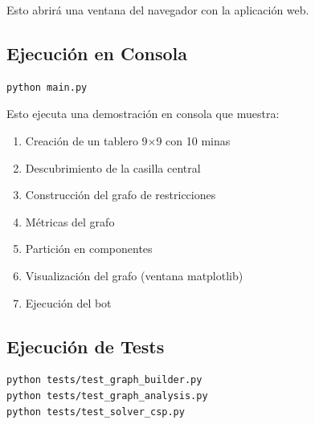 \documentclass[12pt,a4paper]{article}
\begin{document}
Esto abrirá una ventana del navegador con la aplicación web.

\subsection{Ejecución en Consola}

\begin{lstlisting}[language=bash]
python main.py
\end{lstlisting}

Esto ejecuta una demostración en consola que muestra:
\begin{enumerate}[itemsep=2pt]
    \item Creación de un tablero 9$\times$9 con 10 minas
    \item Descubrimiento de la casilla central
    \item Construcción del grafo de restricciones
    \item Métricas del grafo
    \item Partición en componentes
    \item Visualización del grafo (ventana matplotlib)
    \item Ejecución del bot
\end{enumerate}

\subsection{Ejecución de Tests}

\begin{lstlisting}[language=bash]
python tests/test_graph_builder.py
python tests/test_graph_analysis.py
python tests/test_solver_csp.py
\end{lstlisting}

\end{document}
